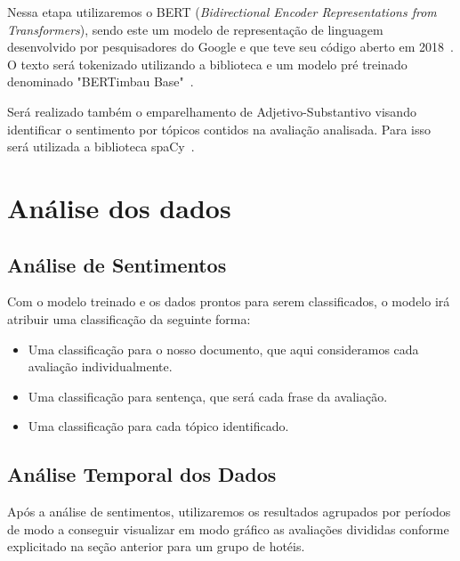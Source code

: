 Nessa etapa utilizaremos o BERT (\emph{Bidirectional Encoder Representations from Transformers}), sendo este um modelo de representação de linguagem desenvolvido por pesquisadores do Google e que teve seu código aberto em 2018~\cite{hugoZanini2021mediu}. O texto será tokenizado utilizando a biblioteca e um modelo pré treinado denominado "BERTimbau Base"~\cite{souza2020bertimbau}.

Será realizado também o emparelhamento de Adjetivo-Substantivo visando identificar o sentimento por tópicos contidos na avaliação analisada. Para isso será utilizada a biblioteca spaCy~\cite{montani2022spacy}. 

\section{Análise dos dados}

\subsection{Análise de Sentimentos}

Com o modelo treinado e os dados prontos para serem classificados, o modelo irá atribuir uma classificação da seguinte forma:
\begin{itemize}
    \item Uma classificação para o nosso documento, que aqui consideramos cada avaliação individualmente.
    \item Uma classificação para sentença, que será cada frase da  avaliação.
    \item Uma classificação para cada tópico identificado.
\end{itemize}

\subsection{Análise Temporal dos Dados}

Após a análise de sentimentos, utilizaremos os resultados agrupados por períodos de modo a conseguir visualizar em modo gráfico as avaliações divididas conforme explicitado na seção anterior para um grupo de hotéis.
